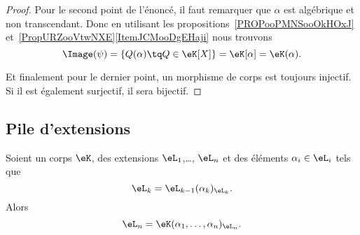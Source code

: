 \begin{proof}
    Pour le second point de l'énoncé, il faut remarquer que \( \alpha\) est algébrique et non transcendant. Donc en utilisant les propositions~\ref{PROPooPMNSooOkHOxJ} et~\ref{PropURZooVtwNXE}\ref{ItemJCMooDgEHaji} nous trouvons
    \begin{equation}
        \Image(\psi)=\{ Q(\alpha)\tq Q\in \eK[X] \}=\eK[\alpha]=\eK(\alpha).
    \end{equation}

    Et finalement pour le dernier point, un morphisme de corps est toujours injectif. Si il est également surjectif, il sera bijectif.
\end{proof}

\subsection{Pile d'extensions}

\begin{lemma}        \label{LEMooTURZooXnjmjT}
    Soient un corps \( \eK\), des extensions \( \eL_1\),\ldots, \( \eL_n\) et des éléments \( \alpha_i\in \eL_i\) tels que
    \begin{equation}
        \eL_k=\eL_{k-1}(\alpha_k)_{\eL_k}.
    \end{equation}
    Alors
    \begin{equation}
        \eL_n=\eK(\alpha_1,\ldots, \alpha_n)_{\eL_n}.
    \end{equation}
\end{lemma}


